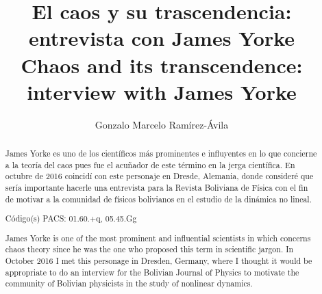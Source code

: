 \documentclass{rbf}
\begin{document}
\title{El caos y su trascendencia: entrevista con James Yorke \\Chaos and its transcendence: interview with James Yorke}

\author{Gonzalo Marcelo Ramírez-Ávila\marca{*}}
%


\begin{abstract}
\Resumen
James Yorke es uno de los científicos más prominentes e influyentes en lo que concierne a la teoría del caos pues fue el acuñador de este término en la jerga científica. En octubre de 2016 coincidí con este personaje en Dresde, Alemania, donde consideré que sería importante hacerle una entrevista para la Revista Boliviana de Física con el fin de motivar a la comunidad de físicos bolivianos en el estudio de la dinámica no lineal.

Código(s) PACS: 01.60.+q, 05.45.Gg

\Abstract
James Yorke is one of the most prominent and influential scientists in which concerns chaos theory since he was the one who proposed this term in scientific jargon. In October 2016 I met this personage in Dresden, Germany, where I thought it would be appropriate to do an interview for the Bolivian Journal of Physics to motivate the community of Bolivian physicists in the study of nonlinear dynamics.
\end{abstract}

\maketitle

\end{document}
